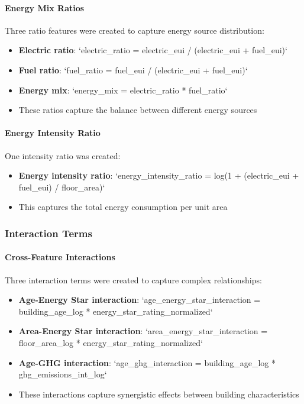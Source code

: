 \paragraph{Energy Mix Ratios}
Three ratio features were created to capture energy source distribution:
\begin{itemize}
    \item \textbf{Electric ratio}: `electric\_ratio = electric\_eui / (electric\_eui + fuel\_eui)`
    \item \textbf{Fuel ratio}: `fuel\_ratio = fuel\_eui / (electric\_eui + fuel\_eui)`
    \item \textbf{Energy mix}: `energy\_mix = electric\_ratio * fuel\_ratio`
    \item These ratios capture the balance between different energy sources
\end{itemize}

\paragraph{Energy Intensity Ratio}
One intensity ratio was created:
\begin{itemize}
    \item \textbf{Energy intensity ratio}: `energy\_intensity\_ratio = log(1 + (electric\_eui + fuel\_eui) / floor\_area)`
    \item This captures the total energy consumption per unit area
\end{itemize}

\subsubsection{Interaction Terms}

\paragraph{Cross-Feature Interactions}
Three interaction terms were created to capture complex relationships:
\begin{itemize}
    \item \textbf{Age-Energy Star interaction}: `age\_energy\_star\_interaction = building\_age\_log * energy\_star\_rating\_normalized`
    \item \textbf{Area-Energy Star interaction}: `area\_energy\_star\_interaction = floor\_area\_log * energy\_star\_rating\_normalized`
    \item \textbf{Age-GHG interaction}: `age\_ghg\_interaction = building\_age\_log * ghg\_emissions\_int\_log`
    \item These interactions capture synergistic effects between building characteristics
\end{itemize}

